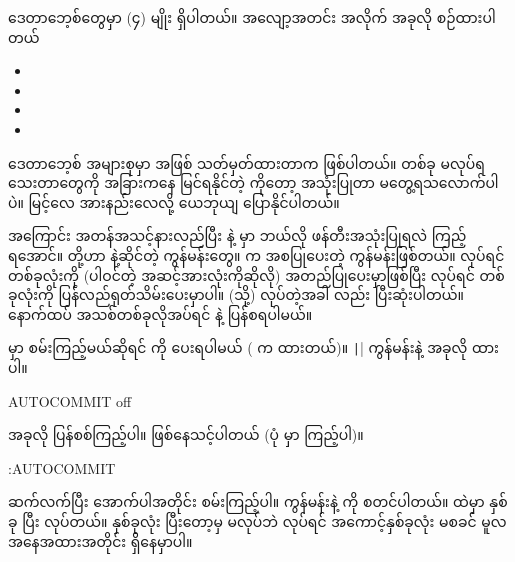 \begin{mytcboxflt}
ဒေတာဘေ့စ်တွေမှာ  (၄) မျိုး ရှိပါတယ်။  အလျော့အတင်း အလိုက်  အခုလို စဉ်ထားပါတယ်
%
\vspace{0.5\baselineskip}
\begin{itemize}
    \setlength\itemsep{0.25em}
    \item {}
    \item {}
    \item {}
    \item {}
\end{itemize}
\vspace{0.5\baselineskip}
%
ဒေတာဘေ့စ် အများစုမှာ  အဖြစ် သတ်မှတ်ထားတာက  ဖြစ်ပါတယ်။  တစ်ခု  မလုပ်ရသေးတာတွေကို အခြားကနေ မြင်ရနိုင်တဲ့  ကိုတော့ အသုံးပြုတာ မတွေ့ရသလောက်ပါပဲ။  မြင့်လေ   အားနည်းလေလို့ ယေဘုယျ ပြောနိုင်ပါတယ်။   
\end{mytcboxflt}

 အကြောင်း အတန်အသင့်နားလည်ပြီး  နဲ့  မှာ ဘယ်လို ဖန်တီးအသုံးပြုရလဲ ကြည့်ရအောင်။ \fEn{,} \fEn{,}  တို့ဟာ  နဲ့ဆိုင်တဲ့  ကွန်မန်းတွေ။  က  အစပြုပေးတဲ့ ကွန်မန်းဖြစ်တယ်။  လုပ်ရင်  တစ်ခုလုံးကို (ပါဝင်တဲ့ အဆင့်အားလုံးကိုဆိုလို) အတည်ပြုပေးမှာဖြစ်ပြီး  လုပ်ရင်  တစ်ခုလုံးကို ပြန်လည်ရုတ်သိမ်းပေးမှာပါ။  (သို့)  လုပ်တဲ့အခါ  လည်း ပြီးဆုံးပါတယ်။ နောက်ထပ် အသစ်တစ်ခုလိုအပ်ရင်  နဲ့ ပြန်စရပါမယ်။  

 မှာ စမ်းကြည့်မယ်ဆိုရင်  ကို  ပေးရပါမယ် ( က  ထားတယ်)။ \texttt|\set| ကွန်မန်းနဲ့ အခုလို  ထားပါ။
%
\begin{codetxt}
\set AUTOCOMMIT off
\end{codetxt}
%
အခုလို ပြန်စစ်ကြည့်ပါ။  ဖြစ်နေသင့်ပါတယ် (ပုံ \fRefNo{\ref{fig:tx}} မှာ ကြည့်ပါ)။
\begin{codetxt}
\echo :AUTOCOMMIT
\end{codetxt}

ဆက်လက်ပြီး အောက်ပါအတိုင်း စမ်းကြည့်ပါ။  ကွန်မန်းနဲ့  ကို စတင်ပါတယ်။  ထဲမှာ  နှစ်ခု  ပြီး  လုပ်တယ်။  နှစ်ခုလုံး  ပြီးတော့မှ  မလုပ်ဘဲ  လုပ်ရင် အကောင့်နှစ်ခုလုံး  မစခင် မူလအနေအထားအတိုင်း ရှိနေမှာပါ။ 

